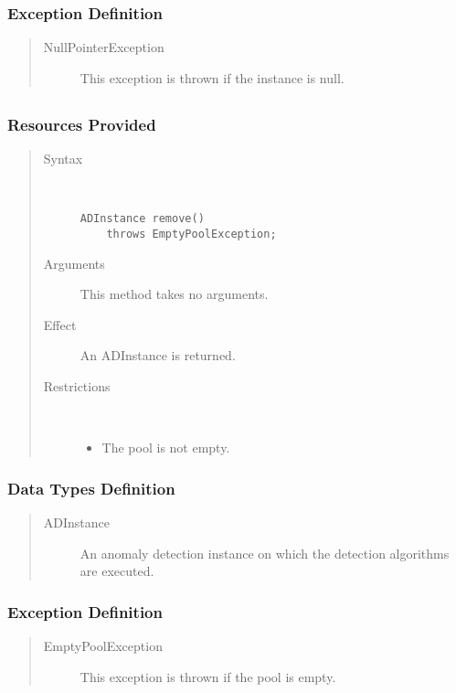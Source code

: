 \subsubsection{Exception Definition}

\begin{quote}
	\begin{description}
		\item[NullPointerException] This exception is thrown if the instance is null.
	\end{description} 
\end{quote}

\subsection{}

\subsubsection{Resources Provided}

\begin{quote}
	\begin{description}
		\item[Syntax] \ 
		\begin{verbatim}
ADInstance remove() 
    throws EmptyPoolException;
		\end{verbatim}
		\item[Arguments] This method takes no arguments.
		\item[Effect] An ADInstance is returned.
		\item[Restrictions] \ 
		\begin{itemize}
			\item The pool is not empty. 
		\end{itemize}
	\end{description} 
\end{quote}

\subsubsection{Data Types Definition}

\begin{quote}
	\begin{description}
		\item[ADInstance] An anomaly detection instance on which the
		detection algorithms are executed.
	\end{description} 
\end{quote}

\subsubsection{Exception Definition}

\begin{quote}
	\begin{description}
		\item[EmptyPoolException] This exception is thrown if the pool is empty.
	\end{description} 
\end{quote}

